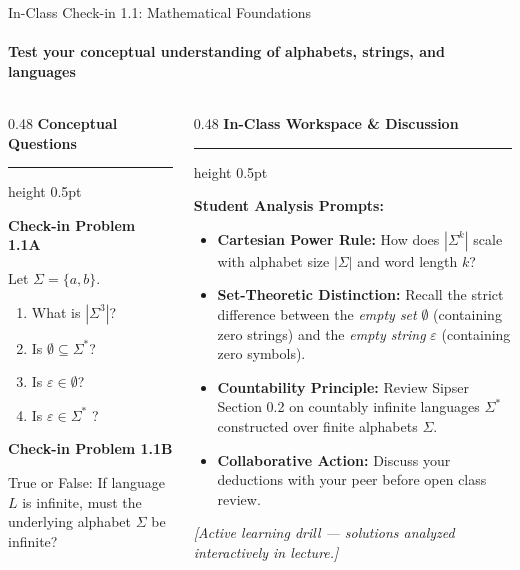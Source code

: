 \documentclass[aspectratio=169, 10pt]{beamer}
\newcommand{\colheader}[1]{%
  {\noindent\footnotesize\bfseries\color{gimpanavy}#1}%
  \vspace{0.02cm}%
  {\color{gimpanavy!30}\hrule height 0.5pt}%
  \vspace{0.05cm}%
}
\newcommand{\cardtitle}[1]{{\noindent\footnotesize\bfseries\color{gimpanavy}#1}\par\vspace{0.03cm}}
\newcommand{\ambertitle}[1]{{\noindent\footnotesize\bfseries\color{accentAmber}#1}\par\vspace{0.03cm}}
\begin{document}
\begin{frame}{In-Class Check-in 1.1: Mathematical Foundations}
  \framesubtitle{Test your conceptual understanding of alphabets, strings, and languages}
  
  \begin{columns}[T]
    \begin{column}{0.48\textwidth}
      \colheader{Conceptual Questions}
      \begin{tcolorbox}[quizcard]
        \ambertitle{Check-in Problem 1.1A}
        {\scriptsize
        Let $\Sigma = \{a, b\}$. 
        \begin{enumerate}\setlength{\itemsep}{2pt}\scriptsize
          \item What is $|\Sigma^3|$?
          \item Is $\emptyset \subseteq \Sigma^*$?
          \item Is $\varepsilon \in \emptyset$?
          \item Is $\varepsilon \in \Sigma^*$ ?
        \end{enumerate}
        }
        \vspace{0.06cm}
        
        \ambertitle{Check-in Problem 1.1B}
        {\scriptsize
        True or False: If language $L$ is infinite, must the underlying alphabet $\Sigma$ be infinite?
        }
      \end{tcolorbox}
    \end{column}
    
    \begin{column}{0.48\textwidth}
      \colheader{In-Class Workspace \& Discussion}
      \begin{tcolorbox}[conceptcard]
        \cardtitle{Student Analysis Prompts:}
        \begin{itemize}\setlength{\itemsep}{3pt}\scriptsize
          \item \textbf{Cartesian Power Rule:} How does $|\Sigma^k|$ scale with alphabet size $|\Sigma|$ and word length $k$?
          \item \textbf{Set-Theoretic Distinction:} Recall the strict difference between the \textit{empty set} $\emptyset$ (containing zero strings) and the \textit{empty string} $\varepsilon$ (containing zero symbols).
          \item \textbf{Countability Principle:} Review Sipser Section 0.2 on countably infinite languages $\Sigma^*$ constructed over finite alphabets $\Sigma$.
          \item \textbf{Collaborative Action:} Discuss your deductions with your peer before open class review.
        \end{itemize}
        \vspace{0.20cm}
        {\tiny\color{charcoalText}\textit{[Active learning drill --- solutions analyzed interactively in lecture.]}}
      \end{tcolorbox}
    \end{column}
  \end{columns}
  

\end{frame}
\end{document}
